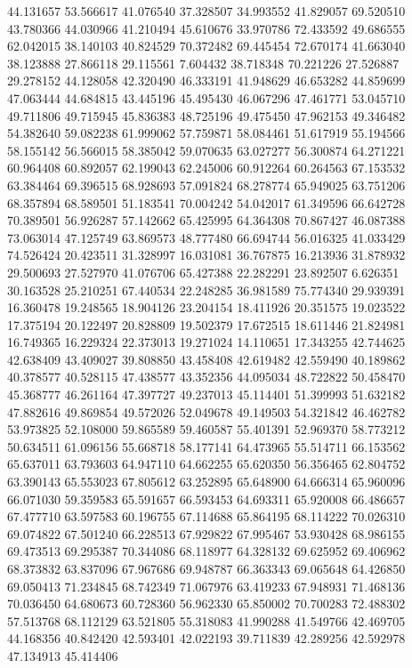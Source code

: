 44.131657
53.566617
41.076540
37.328507
34.993552
41.829057
69.520510
43.780366
44.030966
41.210494
45.610676
33.970786
72.433592
49.686555
62.042015
38.140103
40.824529
70.372482
69.445454
72.670174
41.663040
38.123888
27.866118
29.115561
7.604432
38.718348
70.221226
27.526887
29.278152
44.128058
42.320490
46.333191
41.948629
46.653282
44.859699
47.063444
44.684815
43.445196
45.495430
46.067296
47.461771
53.045710
49.711806
49.715945
45.836383
48.725196
49.475450
47.962153
49.346482
54.382640
59.082238
61.999062
57.759871
58.084461
51.617919
55.194566
58.155142
56.566015
58.385042
59.070635
63.027277
56.300874
64.271221
60.964408
60.892057
62.199043
62.245006
60.912264
60.264563
67.153532
63.384464
69.396515
68.928693
57.091824
68.278774
65.949025
63.751206
68.357894
68.589501
51.183541
70.004242
54.042017
61.349596
66.642728
70.389501
56.926287
57.142662
65.425995
64.364308
70.867427
46.087388
73.063014
47.125749
63.869573
48.777480
66.694744
56.016325
41.033429
74.526424
20.423511
31.328997
16.031081
36.767875
16.213936
31.878932
29.500693
27.527970
41.076706
65.427388
22.282291
23.892507
6.626351
30.163528
25.210251
67.440534
22.248285
36.981589
75.774340
29.939391
16.360478
19.248565
18.904126
23.204154
18.411926
20.351575
19.023522
17.375194
20.122497
20.828809
19.502379
17.672515
18.611446
21.824981
16.749365
16.229324
22.373013
19.271024
14.110651
17.343255
42.744625
42.638409
43.409027
39.808850
43.458408
42.619482
42.559490
40.189862
40.378577
40.528115
47.438577
43.352356
44.095034
48.722822
50.458470
45.368777
46.261164
47.397727
49.237013
45.114401
51.399993
51.632182
47.882616
49.869854
49.572026
52.049678
49.149503
54.321842
46.462782
53.973825
52.108000
59.865589
59.460587
55.401391
52.969370
58.773212
50.634511
61.096156
55.668718
58.177141
64.473965
55.514711
66.153562
65.637011
63.793603
64.947110
64.662255
65.620350
56.356465
62.804752
63.390143
65.553023
67.805612
63.252895
65.648900
64.666314
65.960096
66.071030
59.359583
65.591657
66.593453
64.693311
65.920008
66.486657
67.477710
63.597583
60.196755
67.114688
65.864195
68.114222
70.026310
69.074822
67.501240
66.228513
67.929822
67.995467
53.930428
68.986155
69.473513
69.295387
70.344086
68.118977
64.328132
69.625952
69.406962
68.373832
63.837096
67.967686
69.948787
66.363343
69.065648
64.426850
69.050413
71.234845
68.742349
71.067976
63.419233
67.948931
71.468136
70.036450
64.680673
60.728360
56.962330
65.850002
70.700283
72.488302
57.513768
68.112129
63.521805
55.318083
41.990288
41.549766
42.469705
44.168356
40.842420
42.593401
42.022193
39.711839
42.289256
42.592978
47.134913
45.414406
